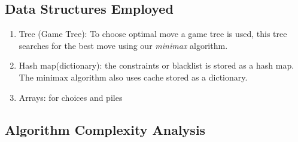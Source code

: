 \documentclass{article}
\begin{document}
\subsection*{Data Structures Employed}
\begin{enumerate}
  \item Tree (Game Tree): To choose optimal move a game tree is used, this tree searches for the best move using our \textit{minimax} algorithm. 
  \item Hash map(dictionary): the constraints or blacklist is stored as a hash map. The minimax algorithm also uses cache stored as a dictionary. 
  \item Arrays: for choices and piles
\end{enumerate}
\subsection*{Algorithm Complexity Analysis}
\end{document}

